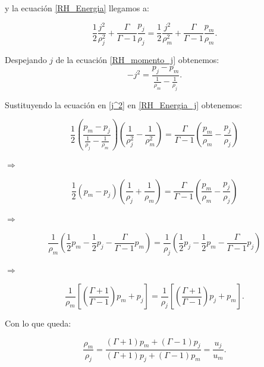 \documentclass[12pt,a4paper]{book}
\begin{document}
\noindent y la ecuación \ref{RH_Energia} llegamos a:

\begin{equation}\label{RH_Energia_j}
\frac{1}{2} \frac{j^{2}}{\rho_{j}^2}+\frac{\Gamma}{\Gamma-1} \frac{p_{j}}{\rho_{j}}=
\frac{1}{2} \frac{j^{2}}{\rho_{m}^2}+\frac{\Gamma}{\Gamma-1} \frac{p_{m}}{\rho_{m}}.
\end{equation}

\noindent Despejando $j$ de la ecuación \ref{RH_momento_j} obtenemos:
\begin{equation}\label{j^2}
-j^{2}=\frac{p_{j}-p_{m}}{\frac{1}{\rho_{m}}-\frac{1}{\rho_{j}}}.
\end{equation}

\noindent Sustituyendo la ecuación en \ref{j^2} en \ref{RH_Energia_j} obtenemos:

\begin{equation*}
\frac{1}{2} \left( \frac{p_{m}-p_{j}}{\frac{1}{\rho_{j}}-\frac{1}{\rho_{m}}} \right)
\left(\frac{1}{\rho_{j}^{2}}-\frac{1}{\rho_{m}^{2}} \right)
=
\frac{\Gamma}{\Gamma-1}
\left( \frac{p_{m}}{\rho_{m}}-\frac{p_{j}}{\rho_{j}} \right)
\end{equation*}

$\Rightarrow$

\begin{equation*}
\frac{1}{2}	\left( p_{m} - p_{j} \right)
\left( \frac{1}{\rho_{j}}+\frac{1}{\rho_{m}} \right)
=
\frac{\Gamma}{\Gamma-1}
\left( \frac{p_{m}}{\rho_{m}}-\frac{p_{j}}{\rho_{j}} \right)
\end{equation*}

$\Rightarrow$

\begin{equation*}
\frac{1}{\rho_{m}} \left( \frac{1}{2} p_{m}- \frac{1}{2} p_{j}-
\frac{\Gamma}{\Gamma-1} p_{m} \right)
=
\frac{1}{\rho_{j}} \left( \frac{1}{2} p_{j}- \frac{1}{2} p_{m}-
\frac{\Gamma}{\Gamma-1} p_{j} \right)
\end{equation*}

$\Rightarrow$

\begin{equation*}
\frac{1}{\rho_{m}} \left[  \left(\frac{\Gamma + 1}{\Gamma - 1} \right) p_{m} + p_{j} \right]
=
\frac{1}{\rho_{j}} \left[  \left(\frac{\Gamma + 1}{\Gamma - 1} \right) p_{j} + p_{m} \right].
\end{equation*}

\noindent Con lo que queda:

\begin{equation}\label{RH_no_rel_choque_no_fuerte}
\frac{\rho_{m}}{\rho_j} =
\frac{\left( \Gamma +1 \right) p_{m}+ \left( \Gamma -1 \right) p_{j
}}{\left(\Gamma +1 \right) p_{j}+ \left( \Gamma -1 \right) p_{m}}
= \frac{u_j}{u_m}.
\end{equation}
\end{document}
